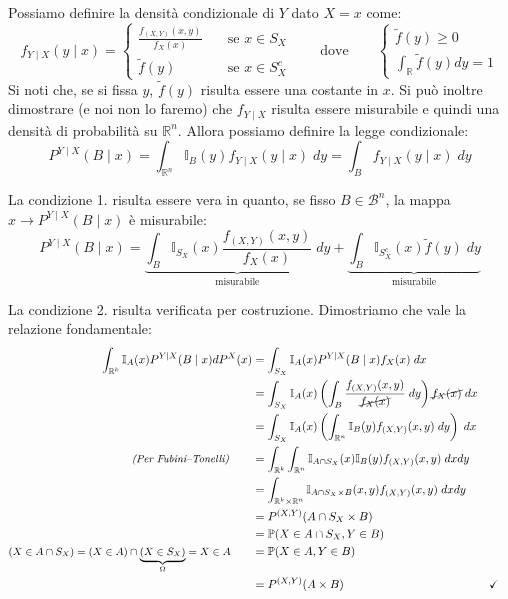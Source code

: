 \medskip
\noindent Possiamo definire la densità condizionale di $Y$ dato $X=x$ come:
\[\boxed{f_{Y\mid X}(y\mid x) = \begin{cases}
    \frac{f_{(X, Y)}(x, y)}{f_X(x)} \quad &\text{se } x\in S_X\\
    \tilde{f}(y) & \text{se } x\in S_X^c
\end{cases}}\qquad \text{dove}\qquad \begin{cases}
    \tilde{f}(y) \geq 0\\
    \int_\mathbb{R}\tilde{f}(y)dy = 1
\end{cases}\]
Si noti che, se si fissa $y$, $\tilde{f}(y)$ risulta essere una costante in $x$. Si può inoltre dimostrare (e noi non lo faremo) che $f_{Y\mid X}$ risulta essere misurabile e quindi una densità di probabilità su $\mathbb{R}^n$. Allora possiamo definire la legge condizionale:
\[P^{Y\mid X}(B\mid x) = \int_{\mathbb{R}^n} \mathbb{I}_B(y) f_{Y\mid X}(y\mid x)\;dy = \int_B f_{Y\mid X}(y\mid x)\;dy \]

\noindent La condizione 1. risulta essere vera in quanto, se fisso $B\in \mathcal{B}^n$, la mappa $x \longrightarrow P^{Y\mid X}(B\mid x)$ è misurabile:
\[P^{Y\mid X}(B\mid x) = \underbrace{\int_B \mathbb{I}_{S_X}(x)\frac{f_{(X, Y)}(x, y)}{f_X(x)}\;dy}_{\text{misurabile}} + \underbrace{\int_B\mathbb{I}_{S_X^c}(x)\tilde{f}(y)\;dy}_{\text{misurabile}}\]

\noindent La condizione 2. risulta verificata per costruzione. Dimostriamo che vale la relazione fondamentale:
\begin{align*}
    \int_{\mathbb{R}^k} \mathbb{I}_A(x) P^{Y\mid X}(B\mid x) dP^X(x) & = \int_{S_X} \mathbb{I}_A(x) P^{Y\mid X}(B\mid x) f_X(x)\;dx \\
    & = \int_{S_X} \mathbb{I}_A(x) \left(\int_B\frac{f_{(X, Y)}(x, y)}{\cancel{f_X(x)}}\;dy\right) \cancel{f_X(x)}\;dx \\
    & = \int_{S_X} \mathbb{I}_A(x) \left(\int_{\mathbb{R}^n}\mathbb{I}_B(y)f_{(X, Y)}(x, y)\;dy \right)\;dx\\
  \textit{\small(Per Fubini--Tonelli)}\qquad  & = \int_{\mathbb{R}^k}\int_{\mathbb{R}^n} \mathbb{I}_{A\cap S_X}(x) \mathbb{I}_B(y)f_{(X, Y)}(x, y)\;dxdy\\
  & = \int_{\mathbb{R}^k\times \mathbb{R}^n} \mathbb{I}_{A\cap S_X\times B}(x, y) f_{(X, Y)}(x, y)\;dxdy \\
  & = P^{(X, Y)}(A\cap S_X \times B) \\
  & = \mathbb{P}(X\in A\cap S_X, Y\in B)\\
  \small\textit{$(X\in A\cap S_X) = (X\in A)\cap \underbrace{(X\in S_X)}_\Omega = X\in A$}\qquad & = \mathbb{P}(X\in A, Y\in B) \\
  & = P^{(X, Y)}(A\times B) &&\checkmark
\end{align*}

